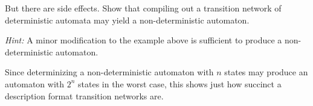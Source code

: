 \begin{exercise}
\begin{center}
    \end{center}
    
    But there are side effects.
    Show that compiling out a transition network of deterministic automata may yield a non-deterministic automaton.

    \emph{Hint:} A minor modification to the example above is sufficient to produce a non-deterministic automaton.
\end{exercise}

Since determinizing a non-deterministic automaton with $n$ states may produce an automaton with $2^n$ states in the worst case, this shows just how succinct a description format transition networks are.

